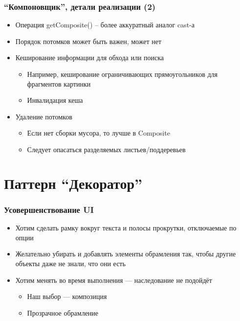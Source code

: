 \documentclass[xetex,mathserif,serif]{beamer}
\begin{document}
    \begin{frame}
        \frametitle{``Компоновщик'', детали реализации (2)}
        \begin{itemize}
            \item Операция getComposite() – более аккуратный аналог cast-а
            \item Порядок потомков может быть важен, может нет
            \item Кеширование информации для обхода или поиска
            \begin{itemize}
                \item Например, кеширование ограничивающих прямоугольников для фрагментов картинки
                \item Инвалидация кеша
            \end{itemize}
            \item Удаление потомков
            \begin{itemize}
                \item Если нет сборки мусора, то лучше в Composite
                \item Следует опасаться разделяемых листьев/поддеревьев
            \end{itemize}
        \end{itemize}
    \end{frame}

    \section{Паттерн ``Декоратор''}

    \begin{frame}
        \frametitle{Усовершенствование UI}
        \begin{itemize}
            \item Хотим сделать рамку вокруг текста и полосы прокрутки, отключаемые по опции
            \item Желательно убирать и добавлять элементы обрамления так, чтобы другие объекты даже не знали, что они есть
            \item Хотим менять во время выполнения --- наследование не подойдёт
            \begin{itemize}
                \item Наш выбор ­--- композиция
                \item Прозрачное обрамление
            \end{itemize}
        \end{itemize}
    \end{frame}
\end{document}
